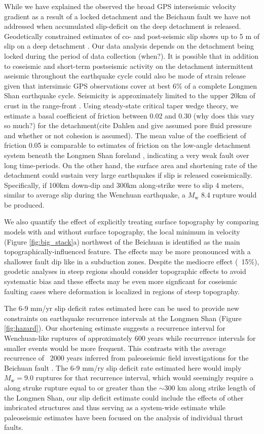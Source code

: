 \documentclass[12pt]{article}
\begin{document}
While we have explained the observed the broad GPS interseismic velocity gradient as a result of a locked detachment and the Beichaun fault we have not addressed when accumulated slip-deficit on the deep detachment is released. Geodetically constrained estimates of co- and post-seismic slip shows up to 5 m of slip on a deep detachment \citep{Qi2011}. Our data analysis depends on the detachment being locked during the period of data collection (when?). It is possible that in addition to coseismic and short-term postseismic activity on the detachment intermittent aseismic throughout the earthquake cycle could also be mode of strain release given that intersimsic GPS observations cover at best 6\% of a complete Longmen Shan earthquake cycle. Seismicity is approximately limited to the upper 20km of crust in the range-front \citep{Li2010}. Using steady-state critical taper wedge theory, we estimate a basal coefficient of friction between 0.02 and 0.30 (why does this vary so much?) for the detachment(cite Dahlen and give assumed pore fluid pressure and whether or not cohesion is assumed). The mean value of the coefficient of friction 0.05 is comparable to estimates of friction on the low-angle detachment system beneath the Longmen Shan foreland \citep{Hubbard2010}, indicating a very weak fault over long time-periods. On the other hand, the surface area and shortening rate of the detachment could sustain very large earthquakes if slip is released coseismically. Specifically, if 100km down-dip and 300km along-strike were to slip 4 meters, similar to average slip during the Wenchuan earthquake, a $M_{\textrm{w}}$ 8.4 rupture would be produced.

We also quantify the effect of explicitly treating surface topography by comparing models with and without surface topography, the local minimum in velocity (Figure \ref{fig:big_stack}a) northwest of the Beichuan is identified as the main topographically-influenced feature. The effects may be more pronounced with a shallower fault dip like in a subduction zones. Despite the mediocre effect (~15\%), geodetic analyses in steep regions should consider topographic effects to avoid systematic bias and these effects may be even more signficant for coseismic faulting cases where deformation is localized in regions of steep topography.

The 6-9 mm/yr slip deficit rates estimated here can be used to provide new constraints on earthquake recurrence intervals at the Longmen Shan (Figure \ref{fig:hazard}). Our shortening estimate suggests a recurrence interval for Wenchuan-like ruptures of approximately 600 years while recurrence intervals for smaller events would be more frequent. This contrasts with the average recurrence of ~2000 years inferred from paleoseismic field investigations for the Beichuan fault \citep{Ran2010}. The 6-9 mm/ry slip deficit rate estimated here would imply $M_{\textrm{w}} = $9.0 ruptures for that recurrence interval, which would seemingly require a along struke rupture equal to or greater than the $\sim 300$ km along strike length of the Longmen Shan, our slip deficit estimate could include the effects of other imbricated structures and thus serving as a system-wide estimate while paleoseismic estimates have been focused on the analysis of individual thrust faults. 
\end{document}
